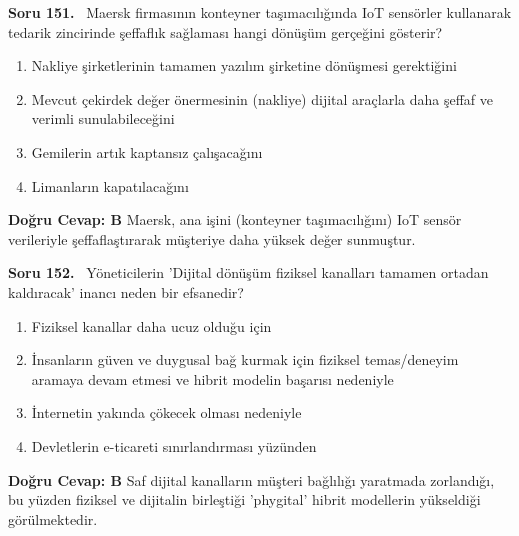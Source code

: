 \documentclass[11pt,a4paper,openany]{book}
\begin{document}
\needspace{5cm}
\vspace{8pt}
\noindent\textbf{\large\sffamily Soru 151.} \ Maersk firmasının konteyner taşımacılığında IoT sensörler kullanarak tedarik zincirinde şeffaflık sağlaması hangi dönüşüm gerçeğini gösterir?
\begin{enumerate}[label=\Alph*), leftmargin=25pt, topsep=4pt, itemsep=2pt]
    \item Nakliye şirketlerinin tamamen yazılım şirketine dönüşmesi gerektiğini
    \item Mevcut çekirdek değer önermesinin (nakliye) dijital araçlarla daha şeffaf ve verimli sunulabileceğini
    \item Gemilerin artık kaptansız çalışacağını
    \item Limanların kapatılacağını
\end{enumerate}
\vspace{4pt}
\begin{tcolorbox}[title=Cevap ve Açıklama, colback=gray!3!white, colframe=primarycolor!90!black, arc=2mm, fonttitle=\bfseries\sffamily, top=6pt, bottom=6pt]
    \textbf{Doğru Cevap: B}
    \vspace{2pt}
    Maersk, ana işini (konteyner taşımacılığını) IoT sensör verileriyle şeffaflaştırarak müşteriye daha yüksek değer sunmuştur.
\end{tcolorbox}
\vspace{10pt}

\needspace{5cm}
\vspace{8pt}
\noindent\textbf{\large\sffamily Soru 152.} \ Yöneticilerin 'Dijital dönüşüm fiziksel kanalları tamamen ortadan kaldıracak' inancı neden bir efsanedir?
\begin{enumerate}[label=\Alph*), leftmargin=25pt, topsep=4pt, itemsep=2pt]
    \item Fiziksel kanallar daha ucuz olduğu için
    \item İnsanların güven ve duygusal bağ kurmak için fiziksel temas/deneyim aramaya devam etmesi ve hibrit modelin başarısı nedeniyle
    \item İnternetin yakında çökecek olması nedeniyle
    \item Devletlerin e-ticareti sınırlandırması yüzünden
\end{enumerate}
\vspace{4pt}
\begin{tcolorbox}[title=Cevap ve Açıklama, colback=gray!3!white, colframe=primarycolor!90!black, arc=2mm, fonttitle=\bfseries\sffamily, top=6pt, bottom=6pt]
    \textbf{Doğru Cevap: B}
    \vspace{2pt}
    Saf dijital kanalların müşteri bağlılığı yaratmada zorlandığı, bu yüzden fiziksel ve dijitalin birleştiği 'phygital' hibrit modellerin yükseldiği görülmektedir.
\end{tcolorbox}
\vspace{10pt}
\end{document}
